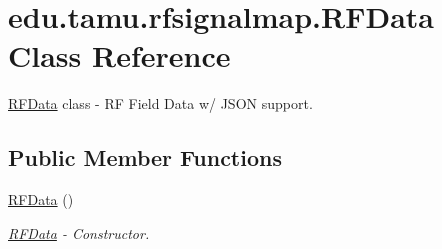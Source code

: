 \hypertarget{classedu_1_1tamu_1_1rfsignalmap_1_1_r_f_data}{}\section{edu.\+tamu.\+rfsignalmap.\+R\+F\+Data Class Reference}
\label{classedu_1_1tamu_1_1rfsignalmap_1_1_r_f_data}


\hyperlink{classedu_1_1tamu_1_1rfsignalmap_1_1_r_f_data}{R\+F\+Data} class -\/ RF Field Data w/ J\+S\+ON support.  


\subsection*{Public Member Functions}
\begin{DoxyCompactItemize}
\item 
\hyperlink{classedu_1_1tamu_1_1rfsignalmap_1_1_r_f_data_a4e1a112c9551e41c445c79c94bf394c2}{R\+F\+Data} ()
\begin{DoxyCompactList}\small\item\em \hyperlink{classedu_1_1tamu_1_1rfsignalmap_1_1_r_f_data}{R\+F\+Data} -\/ Constructor. \end{DoxyCompactList}\end{DoxyCompactItemize}

